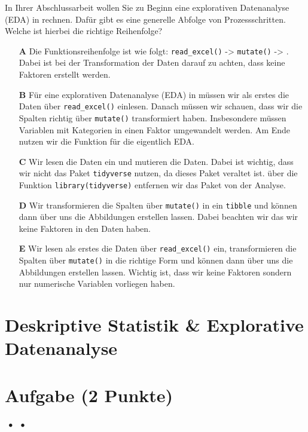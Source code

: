 \documentclass[a4paper, 9pt]{scrartcl}\usepackage[]{graphicx}\usepackage[]{xcolor}
\begin{document}
In Ihrer Abschlussarbeit wollen Sie zu Beginn eine explorativen Datenanalyse (EDA) in \Rlogo rechnen. Dafür gibt es eine generelle Abfolge von Prozessschritten. Welche ist hierbei die richtige Reihenfolge?



\begin{enumerate}
\item [\textbf{A} \msquare] Die Funktionsreihenfolge ist wie folgt: \texttt{read\_excel()} ->  \texttt{mutate()} -> . Dabei ist bei der Transformation der Daten darauf zu achten, dass keine Faktoren erstellt werden.
\item [\textbf{B} \msquare] Für eine explorativen Datenanalyse (EDA) in \Rlogo müssen wir als erstes die Daten über \texttt{read\_excel()} einlesen. Danach müssen wir schauen, dass wir die Spalten richtig über \texttt{mutate()} transformiert haben. Insbesondere müssen Variablen mit Kategorien in einen Faktor umgewandelt werden. Am Ende nutzen wir die Funktion  für die eigentlich EDA.
\item [\textbf{C} \msquare] Wir lesen die Daten ein und mutieren die Daten. Dabei ist wichtig, dass wir nicht das Paket \texttt{tidyverse} nutzen, da dieses Paket veraltet ist. über die Funktion \texttt{library(tidyverse)} entfernen wir das Paket von der Analyse.
\item [\textbf{D} \msquare] Wir transformieren die Spalten über \texttt{mutate()} in ein \texttt{tibble} und können dann über  uns die Abbildungen erstellen lassen. Dabei beachten wir das wir keine Faktoren in den Daten haben.
\item [\textbf{E} \msquare] Wir lesen als erstes die Daten über \texttt{read\_excel()} ein, transformieren die Spalten über \texttt{mutate()} in die richtige Form und können dann  über  uns die Abbildungen erstellen lassen. Wichtig ist, dass wir keine Faktoren sondern nur numerische Variablen vorliegen haben.
\end{enumerate} 
\section*{Deskriptive Statistik \& Explorative Datenanalyse}

\section{Aufgabe \hfill (2 Punkte)}

\ifcollection
\begin{flushright}
\tiny\vspace{-2Ex}
\textbf{\examinhaltstart}
\exammodulemathstat $\;\bullet$
\exammodulestat $\;\bullet$
\exammodulestatbbv 
\vspace{-1Ex}
\end{flushright}
\fi
\end{document}
